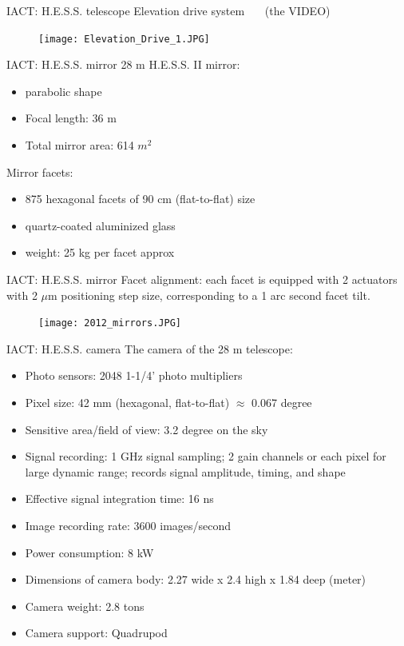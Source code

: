 \documentclass{beamer}
\begin{document}
\begin{frame}{IACT: H.E.S.S. telescope}
	Elevation drive system
	\, \, \, (the VIDEO)
	\begin{figure}[h]
		\texttt{[image: Elevation\_Drive\_1.JPG]}
	\end{figure}
\end{frame}

\begin{frame}{IACT: H.E.S.S. mirror}
	28 m H.E.S.S. II mirror:
	\begin{itemize}
		\item parabolic shape
		\item Focal length: 36 m
		\item Total mirror area: 614 $m^2$
	\end{itemize}
	\hfill \break
	Mirror facets:
	\begin{itemize}
		\item 875 hexagonal facets of 90 cm (flat-to-flat) size
		\item quartz-coated aluminized glass
		\item weight: 25 kg per facet approx
	\end{itemize}
\end{frame}

\begin{frame}{IACT: H.E.S.S. mirror}
	Facet alignment: each facet is equipped with 2 actuators with 2 $\mu\text{m}$ positioning step size, corresponding to a 1 arc second facet tilt.
	\begin{figure}[h]
		\texttt{[image: 2012\_mirrors.JPG]}
	\end{figure}
\end{frame}


\begin{frame}{IACT: H.E.S.S. camera}
	The camera of the 28 m telescope:
	\begin{itemize}
		\item Photo sensors: 2048 1-1/4’ photo multipliers
		\item Pixel size: 42 mm (hexagonal, flat-to-flat) $\approx$ 0.067 degree
		\item Sensitive area/field of view: 3.2 degree on the sky
		\item Signal recording: 1 GHz signal sampling; 2 gain channels or each pixel for large dynamic range; records signal amplitude, timing, and shape
		\item Effective signal integration time: 16 ns
		\item Image recording rate: 3600 images/second
		\item Power consumption: 8 kW
		\item Dimensions of camera body: 2.27 wide x 2.4 high x 1.84 deep (meter)
		\item Camera weight: 2.8 tons
		\item Camera support: Quadrupod
	\end{itemize}
\end{frame}
\end{document}
